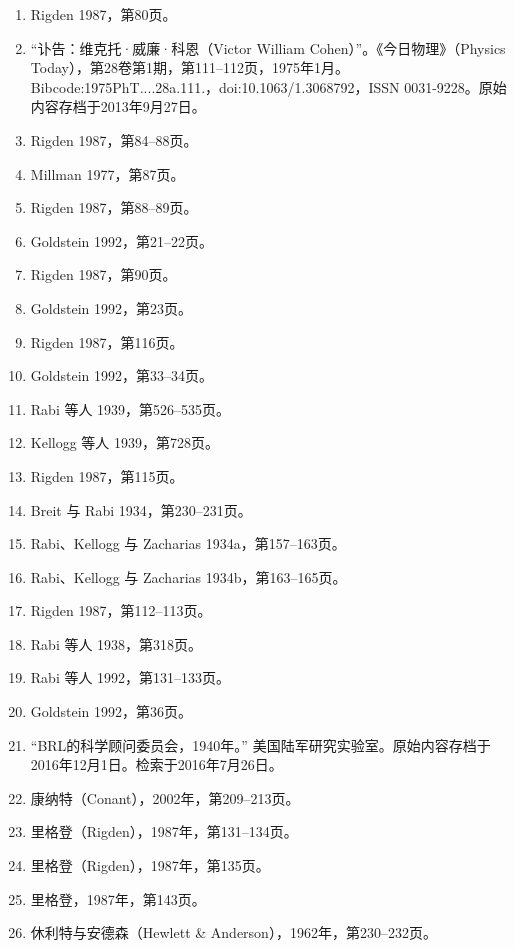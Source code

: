 \begin{enumerate}
\item Rigden 1987，第80页。
\item “讣告：维克托·威廉·科恩（Victor William Cohen）”。《今日物理》（Physics Today），第28卷第1期，第111–112页，1975年1月。Bibcode:1975PhT....28a.111.，doi:10.1063/1.3068792，ISSN 0031-9228。原始内容存档于2013年9月27日。
\item Rigden 1987，第84–88页。
\item Millman 1977，第87页。
\item Rigden 1987，第88–89页。
\item Goldstein 1992，第21–22页。
\item Rigden 1987，第90页。
\item Goldstein 1992，第23页。
\item Rigden 1987，第116页。
\item Goldstein 1992，第33–34页。
\item Rabi 等人 1939，第526–535页。
\item Kellogg 等人 1939，第728页。
\item Rigden 1987，第115页。
\item Breit 与 Rabi 1934，第230–231页。
\item Rabi、Kellogg 与 Zacharias 1934a，第157–163页。
\item Rabi、Kellogg 与 Zacharias 1934b，第163–165页。
\item Rigden 1987，第112–113页。
\item Rabi 等人 1938，第318页。
\item Rabi 等人 1992，第131–133页。
\item Goldstein 1992，第36页。



\item “BRL的科学顾问委员会，1940年。” 美国陆军研究实验室。原始内容存档于2016年12月1日。检索于2016年7月26日。
\item 康纳特（Conant），2002年，第209–213页。
\item 里格登（Rigden），1987年，第131–134页。
\item 里格登（Rigden），1987年，第135页。
\item 里格登，1987年，第143页。
\item 休利特与安德森（Hewlett & Anderson），1962年，第230–232页。

\end{enumerate}